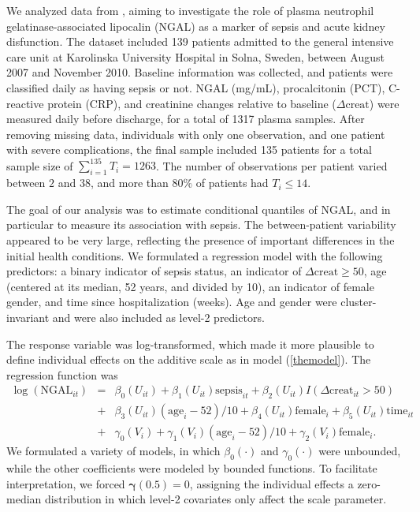 \documentclass[12pt]{article}
\def\gammavec{\bm{\gamma}}
\begin{document}
We analyzed data from \cite{app}, aiming to investigate the role of plasma neutrophil gelatinase-associated lipocalin (NGAL)
as a marker of sepsis and acute kidney disfunction. The dataset included 139 patients admitted to the general intensive care unit at
Karolinska University Hospital in Solna, Sweden, between August 2007 and November 2010. Baseline information was collected, and patients 
were classified daily as having sepsis or not. NGAL (mg/mL), procalcitonin (PCT), C-reactive protein (CRP), and 
creatinine changes relative to baseline ($\Delta{\text{creat}}$) were measured daily before discharge, for a total of 1317 plasma samples. 
After removing missing data, individuals with only one observation, and one patient with severe complications, the final sample
included 135 patients for a total sample size of $\sum_{i = 1}^{135} T_i = 1263$. The number of observations per patient
varied between $2$ and $38$, and more than $80\%$ of patients had $T_i \le 14$. 

The goal of our analysis was to estimate conditional quantiles of NGAL, and in particular to measure its association with sepsis.
The between-patient variability appeared to be very large, reflecting the presence of important differences in the initial health conditions. 
We formulated a regression model with the following predictors: a binary indicator of sepsis status, an indicator of $\Delta{\text{creat}} \ge 50$, 
age (centered at its median, 52 years, and divided by 10), an indicator of female gender, and time since hospitalization (weeks). Age and gender
were cluster-invariant and were also included as level-2 predictors. 

The response variable was log-transformed, which made it more plausible to define individual
effects on the additive scale as in model (\ref{themodel}). 
The regression function was
\begin{eqnarray}
\log(\text{NGAL}_{it}) & = & \beta_0(U_{it}) + \beta_1(U_{it})\text{sepsis}_{it} + \beta_2(U_{it})I(\Delta{\text{creat}}_{it} > 50)  \nonumber \\
 & + & \beta_3(U_{it})(\text{age}_{i} - 52)/10 + \beta_4(U_{it})\text{female}_{i} + \beta_5(U_{it})\text{time}_{it}  \nonumber \\
 & + & \gamma_0(V_{i}) + \gamma_1(V_{i})(\text{age}_{i} - 52)/10 + \gamma_2(V_{i})\text{female}_{i}. \nonumber
\end{eqnarray}
We formulated a variety of models, in which $\beta_0(\cdot)$ and $\gamma_0(\cdot)$ were  unbounded,  
while the other coefficients were modeled by bounded functions.
To facilitate interpretation, we forced $\gammavec(0.5) = 0$, assigning the
individual effects a zero-median distribution in which level-2 covariates only affect the scale parameter.
\end{document}
